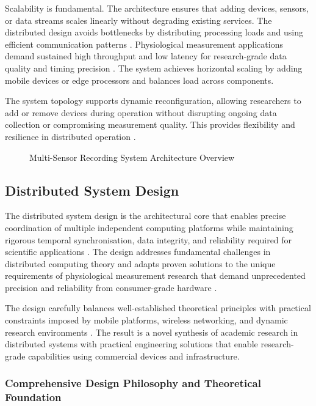 \documentclass[11pt,a4paper]{report}
\begin{document}
Scalability is fundamental. The architecture ensures that adding devices, sensors, or data streams scales linearly without degrading existing services. The distributed design avoids bottlenecks by distributing processing loads and using efficient communication patterns \cite{Bondi2000}. Physiological measurement applications demand sustained high throughput and low latency for research-grade data quality and timing precision \cite{Jain1990}. The system achieves horizontal scaling by adding mobile devices or edge processors and balances load across components.

The system topology supports dynamic reconfiguration, allowing researchers to add or remove devices during operation without disrupting ongoing data collection or compromising measurement quality. This provides flexibility and resilience in distributed operation \cite{Peterson2011}. 

\begin{figure}[ht]
\centering
\framebox[0.9\textwidth][c]{\rule{0pt}{5cm}}
\caption{Multi-Sensor Recording System Architecture Overview}
\label{fig:system-architecture}
\end{figure}

\subsection{Distributed System Design}

The distributed system design is the architectural core that enables precise coordination of multiple independent computing platforms while maintaining rigorous temporal synchronisation, data integrity, and reliability required for scientific applications \cite{Lamport1978}. The design addresses fundamental challenges in distributed computing theory and adapts proven solutions to the unique requirements of physiological measurement research that demand unprecedented precision and reliability from consumer-grade hardware \cite{Lynch1996}. 

The design carefully balances well-established theoretical principles with practical constraints imposed by mobile platforms, wireless networking, and dynamic research environments \cite{Tanenbaum2016}. The result is a novel synthesis of academic research in distributed systems with practical engineering solutions that enable research-grade capabilities using commercial devices and infrastructure.

\subsubsection{Comprehensive Design Philosophy and Theoretical Foundation}
\end{document}
